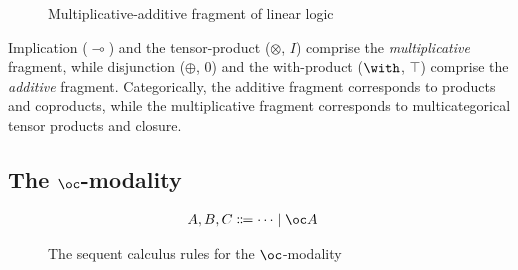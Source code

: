 \begin{figure}
  \caption{Multiplicative-additive fragment of linear logic}
  \label{fig:mall}
\end{figure}

Implication ($\multimap$) and the tensor-product ($\otimes$, $I$) comprise the
\emph{multiplicative} fragment, while disjunction ($\oplus$, $0$) and the
with-product ($\with$, $\top$) comprise the \emph{additive} fragment.
Categorically, the additive fragment corresponds to products and coproducts,
while the multiplicative fragment corresponds to multicategorical tensor
products and closure.

\subsection{The $\oc$-modality}\label{sec:bang-modality}

\begin{figure}
  \begin{align*}
    A, B, C &\Coloneqq \dots \mid \oc A
  \end{align*}
  \caption{The sequent calculus rules for the $\oc$-modality}
  \label{fig:bang-seq}
\end{figure}

